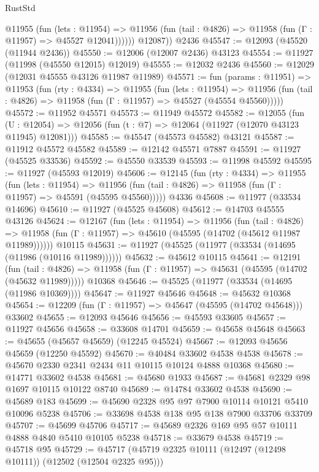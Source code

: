 \begin{lexlean}{RustStd}
\begin{coremodule}
            @11955
              (fun (lets : @11954) =>
              @11956 (fun (tail : @4826) => @11958 (fun (Γ : @11957) => @45527 @12041))))))
        @12087))
    @2436
@45547 := @12093 (@45520 (@11944 @2436))
@45550 := @12006 (@12007 @2436) @43123
@45554 := @11927 (@11998 (@45550 @12015) @12019)
@45555 := @12032 @2436
@45560 := @12029 (@12031 @45555 @43126 @11987 @11989)
@45571 := fun (params : @11951) =>
  @11953
    (fun (rty : @4334) =>
    @11955
      (fun (lets : @11954) =>
      @11956 (fun (tail : @4826) => @11958 (fun (Γ : @11957) => @45527 (@45554 @45560)))))
@45572 := @11952 @45571
@45573 := @11949 @45572
@45582 := @12055
    (fun (U : @12054) => @12056 (fun (t : @7) => @12064 (@11927 (@12070 @43123 @11945) @12081)))
@45585 := @45547 (@45573 @45582) @43121
@45587 := @11912 @45572 @45582
@45589 := @12142 @45571 @7887
@45591 := @11927 (@45525 @33536)
@45592 := @45550 @33539
@45593 := @11998 @45592
@45595 := @11927 (@45593 @12019)
@45606 := @12145
    (fun (rty : @4334) =>
    @11955
      (fun (lets : @11954) =>
      @11956 (fun (tail : @4826) => @11958 (fun (Γ : @11957) => @45591 (@45595 @45560)))))
    @4336
@45608 := @11977 (@33534 @14696)
@45610 := @11927 (@45525 @45608)
@45612 := @14703 @45555 @43126
@45624 := @12167
    (fun (lets : @11954) =>
    @11956
      (fun (tail : @4826) =>
      @11958 (fun (Γ : @11957) => @45610 (@45595 (@14702 (@45612 @11987 @11989))))))
    @10115
@45631 := @11927 (@45525 (@11977 (@33534 (@14695 (@11986 (@10116 @11989))))))
@45632 := @45612 @10115
@45641 := @12191
    (fun (tail : @4826) => @11958 (fun (Γ : @11957) => @45631 (@45595 (@14702 (@45632 @11989)))))
    @10368
@45646 := @45525 (@11977 (@33534 (@14695 (@11986 @10369))))
@45647 := @11927 @45646
@45648 := @45632 @10368
@45654 := @12209 (fun (Γ : @11957) => @45647 (@45595 (@14702 @45648))) @33602
@45655 := @12093 @45646
@45656 := @45593 @33605
@45657 := @11927 @45656
@45658 := @33608 @14701
@45659 := @45658 @45648
@45663 := @45655 (@45657 @45659) (@12245 @45524)
@45667 := @12093 @45656 @45659 (@12250 @45592)
@45670 := @40484 @33602 @4538 @4538
@45678 := @45670 @2330 @2341 @2434 @11 @10115 @10124 @4888 @10368
@45680 := @14771 @33602 @4538
@45681 := @45680 @1933
@45687 := @45681 @2329 @98 @1697 @10115 @10122 @8740
@45689 := @14784 @33602 @4538
@45690 := @45689 @183
@45699 := @45690 @2328 @95 @97 @7900 @10114 @10121 @5410 @10096 @5238
@45706 := @33698 @4538 @138 @95 @138 @7900 @33706 @33709
@45707 := @45699 @45706
@45717 := @45689 @2326 @169 @95 @57 @10111 @4888 @4840 @5410 @10105 @5238
@45718 := @33679 @4538
@45719 := @45718 @95
@45729 := @45717 (@45719 @2325 @10111 (@12497 (@12498 @10111)) (@12502 (@12504 @2325 @95)))

\end{coremodule}
\end{lexlean}
